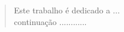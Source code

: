 

\vspace{13cm}



\begin{quote}
  \hspace{7cm} Este trabalho é dedicado a ...\\ 
  
  \vspace{-10mm}
   \hspace{7cm}   continuação ............ 
\end{quote}



\clearpage
\pagebreak


